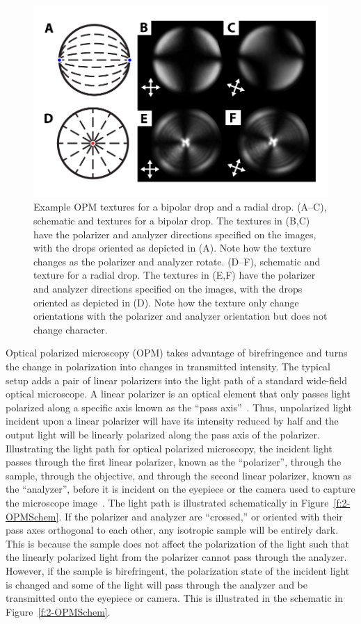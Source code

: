 \begin{figure}[h]
  \centering
  \includegraphics{figures/C2/Ch2-Figs_OPMDrops.png}
  \caption{Example OPM textures for a bipolar drop and a radial drop.
  (A--C), schematic and textures for a bipolar drop.
  The textures in (B,C) have the polarizer and analyzer directions specified on the images, with the drops oriented as depicted in (A).
  Note how the texture changes as the polarizer and analyzer rotate.
  (D--F), schematic and texture for a radial drop.
  The textures in (E,F) have the polarizer and analyzer directions specified on the images, with the drops oriented as depicted in (D).
  Note how the texture only change orientations with the polarizer and analyzer orientation but does not change character.}\label{f:2-OPMDrops}
\end{figure}

Optical polarized microscopy (OPM) takes advantage of birefringence and turns the change in polarization into changes in transmitted intensity.
The typical setup adds a pair of linear polarizers into the light path of a standard wide-field optical microscope.
A linear polarizer is an optical element that only passes light polarized along a specific axis known as the ``pass axis''~\cite{RN232}.
Thus, unpolarized light incident upon a linear polarizer will have its intensity reduced by half and the output light will be linearly polarized along the pass axis of the polarizer.
Illustrating the light path for optical polarized microscopy, the incident light passes through the first linear polarizer, known as the ``polarizer'', through the sample, through the objective, and through the second linear polarizer, known as the ``analyzer'', before it is incident on the eyepiece or the camera used to capture the microscope image~\cite{RN232}.
The light path is illustrated schematically in Figure~\ref{f:2-OPMSchem}.
If the polarizer and analyzer are ``crossed,'' or oriented with their pass axes orthogonal to each other, any isotropic sample will be entirely dark.
This is because the sample does not affect the polarization of the light such that the linearly polarized light from the polarizer cannot pass through the analyzer.
However, if the sample is birefringent, the polarization state of the incident light is changed and some of the light will pass through the analyzer and be transmitted onto the eyepiece or camera.
This is illustrated in the schematic in Figure~\ref{f:2-OPMSchem}.

